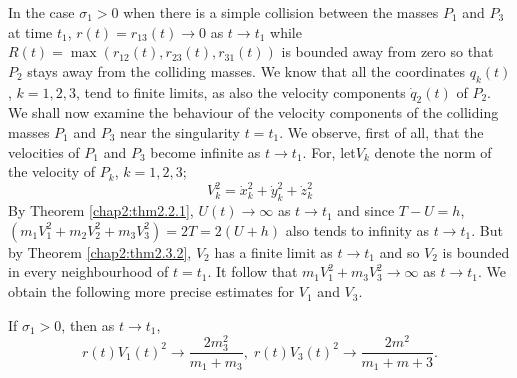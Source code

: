 In the case $\sigma_1 > 0$ when there is a simple collision between the masses $P_1$ and $P_3$ at time $t_1$, $r(t) = r_{13} (t) \to 0$ as $t \to t_1$ while $R(t) = \max (r_{12}(t), r_{23}(t), r_{31} (t))$ is bounded away from zero so that $P_2$ stays away from the colliding masses. We know that all the coordinates $q_k(t)$, $k = 1,2,3$, tend to finite limits, as also the velocity components $\dot{q}_2(t)$ of $P_2$. We shall now examine the behaviour of the velocity components of the colliding masses $P_1$ and $P_3$ near the singularity $t=t_1$. We observe, first of all, that the velocities of $P_1$ and $P_3$ become infinite as $t \to t_1$. For, let\pageoriginale $V_k$ denote the norm of the velocity of $P_k$, $k =1,2,3$;
\begin{equation*}
V^2_k = \dot{x}^2_k + \dot{y}^2_k + \dot{z}^2_k \tag{2.3.2}\label{chap2:eq2.3.2} 
\end{equation*}
By Theorem \ref{chap2:thm2.2.1}, $U(t) \to \infty$ as $t \to t_1$ and since $T-U = h$, $(m_1 V^2_1 + m_2 V^2_2 + m_3 V^2_3) = 2T = 2(U+h)$ also tends to infinity as $t \to t_1$. But by Theorem \ref{chap2:thm2.3.2}, $V_2$ has a finite limit as $t \to t_1$ and so $V_2$ is bounded in every neighbourhood of $t = t_1$. It follow that $m_1V^2_1 + m_3 V^2_3 \to \infty$ as $t \to t_1$. We obtain the following more precise estimates for $V_1$ and $V_3$. 

\begin{subtheorem}\label{chap2:thm2.3.3}
If $\sigma_1 >0$, then as $t \to t_1$,
$$
r(t) V_1 (t)^2  \to \frac{2m^2_3}{m_1 + m_3}, \; r(t) V_3 (t)^2 \to \frac{2m^2}{m_1+m+3}. 
$$
\end{subtheorem}

